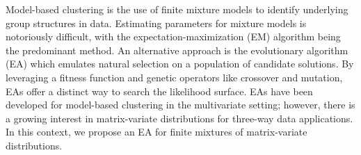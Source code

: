 
Model-based clustering is the use of finite mixture models to identify underlying group structures in data. Estimating parameters for mixture models is notoriously difficult, with the expectation-maximization (EM) algorithm being the predominant method. An alternative approach is the evolutionary algorithm (EA) which emulates natural selection on a population of candidate solutions. By leveraging a fitness function and genetic operators like crossover and mutation, EAs offer a distinct way to search the likelihood surface. EAs have been developed for model-based clustering in the multivariate setting; however, there is a growing interest in matrix-variate distributions for three-way data applications. In this context, we propose an EA for finite mixtures of matrix-variate distributions.